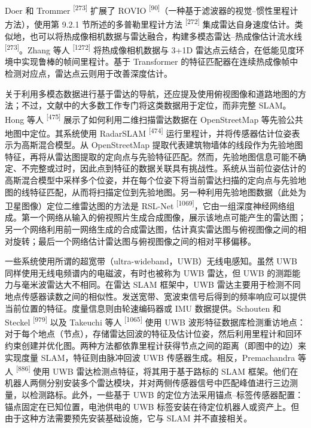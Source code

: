 Doer 和 Trommer \textsuperscript{[273]} 扩展了 ROVIO \textsuperscript{[90]}（一种基于滤波器的视觉--惯性里程计方法），使用第 9.2.1 节所述的多普勒里程计方法 \textsuperscript{[272]} 集成雷达自身速度估计。类似地，也可以将热成像相机数据与雷达融合，构建多模态雷达--热成像估计流水线 \textsuperscript{[273]}。Zhang 等人 \textsuperscript{[1272]} 将热成像相机数据与 3+1D 雷达点云结合，在低能见度环境中实现鲁棒的帧间里程计。基于 Transformer 的特征匹配器在连续热成像帧中检测对应点，雷达点云则用于改善深度估计。

关于利用多模态数据进行基于雷达的导航，还应提及使用俯视图像和道路地图的方法；不过，文献中的大多数工作专门将这类数据用于定位，而非完整 SLAM。Hong 等人 \textsuperscript{[475]} 展示了如何利用二维扫描雷达数据在 OpenStreetMap 等先验公共地图中定位。其系统使用 RadarSLAM \textsuperscript{[474]} 运行里程计，并将传感器估计位姿表示为高斯混合模型。从 OpenStreetMap 提取代表建筑物墙体的线段作为先验地图特征，再将从雷达图提取的定向点与先验特征匹配。然而，先验地图信息可能不确定、不完整或过时，因此点到特征的数据关联具有挑战性。系统从当前位姿估计的高斯混合模型中采样多个位姿，并在每个位姿下将当前雷达扫描的定向点与先验地图的线特征匹配，从而将扫描定位到先验地图。另一种利用先验地图数据（此处为卫星图像）定位二维雷达图的方法是 RSL-Net \textsuperscript{[1069]}，它由一组深度神经网络组成。第一个网络从输入的俯视照片生成合成图像，展示该地点可能产生的雷达图；另一个网络利用前一网络生成的合成雷达图，估计真实雷达图与俯视图像之间的相对旋转；最后一个网络估计雷达图与俯视图像之间的相对平移偏移。

一些系统使用所谓的超宽带（ultra-wideband，UWB）无线电感知。虽然 UWB 同样使用无线电频谱内的电磁波，有时也被称为 UWB 雷达，但 UWB 的测距能力与毫米波雷达大不相同。在雷达 SLAM 框架中，UWB 雷达主要用于检测不同地点传感器读数之间的相似性。发送宽带、宽波束信号后得到的频率响应可以提供当前位置的特征。度量信息则由轮速编码器或 IMU 数据提供。Schouten 和 Steckel \textsuperscript{[979]} 以及 Takeuchi 等人 \textsuperscript{[1065]} 使用 UWB 波形特征数据库检测重访地点：对于每个地点（节点），存储雷达回波的特征及估计位姿，然后利用里程计和回环约束创建并优化图。两种方法都依靠里程计获得节点之间的距离（即图中的边）来实现度量 SLAM，特征则由脉冲回波 UWB 传感器生成。相反，Premachandra 等人 \textsuperscript{[886]} 使用 UWB 雷达检测点特征，将其用于基于路标的 SLAM 框架。他们在机器人两侧分别安装多个雷达模块，并对两侧传感器信号中匹配峰值进行三边测量，以检测路标。此外，一些基于 UWB 的定位方法采用锚点--标签传感器配置：锚点固定在已知位置，电池供电的 UWB 标签安装在待定位机器人或资产上。但由于这种方法需要预先安装基础设施，它与 SLAM 并不直接相关。

